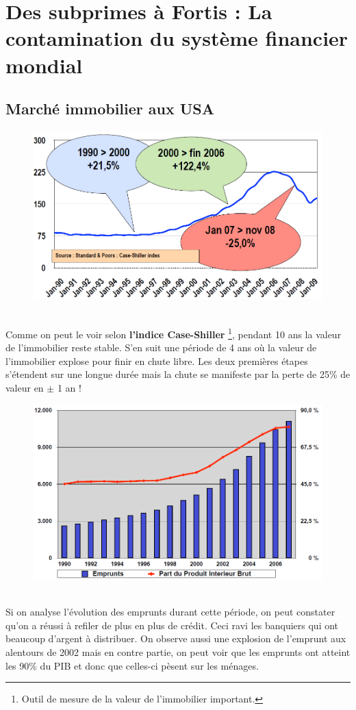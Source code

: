 
\chapter{Des subprimes à Fortis : La contamination du système financier mondial}
\section{Marché immobilier aux USA}
\begin{figure}
\includegraphics[scale=0.3]{2}
\end{figure}
\ \\ Comme on peut le voir selon \textbf{l'indice Case-Shiller} \footnote{Outil de mesure de la valeur de l'immobilier important.}, pendant 10 ans la valeur de l'immobilier reste stable. S'en suit une période de 4 ans où la valeur de l'immobilier explose pour finir en chute libre. Les deux premières étapes s'étendent sur une longue durée mais la chute se manifeste par la perte de 25\% de valeur en $\pm$ 1 an !

\begin{figure}
\includegraphics[scale=0.3]{3}
\end{figure}
\ \\ Si on analyse l'évolution des emprunts durant cette période, on peut constater qu'on a réussi à refiler de plus en plus de crédit. Ceci ravi les banquiers qui ont beaucoup d'argent à distribuer. On observe aussi une explosion de l'emprunt aux alentours de 2002 mais en contre partie, on peut voir que les emprunts ont atteint les 90\% du PIB et donc que celles-ci pèsent sur les ménages. 

